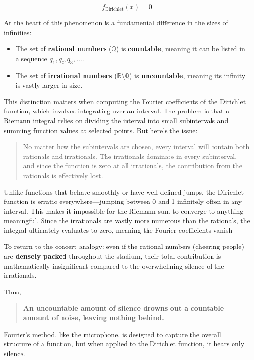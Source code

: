 \[
f_{\text{Dirichlet}}(x) = 0
\]

At the heart of this phenomenon is a fundamental difference in the sizes of infinities:

\begin{itemize}
    \item The set of \textbf{rational numbers} (\(\mathbb{Q}\)) is \textbf{countable}, meaning it can be listed in a sequence \( q_1, q_2, q_3, \dots \).
    \item The set of \textbf{irrational numbers} (\(\mathbb{R} \setminus \mathbb{Q}\)) is \textbf{uncountable}, meaning its infinity is vastly larger in size.
\end{itemize}

This distinction matters when computing the Fourier coefficients of the Dirichlet function, which involves integrating over an interval. The problem is that a Riemann integral relies on dividing the interval into small subintervals and summing function values at selected points. But here’s the issue:

\begin{quote}
No matter how the subintervals are chosen, every interval will contain both rationals and irrationals. The irrationals dominate in every subinterval, and since the function is zero at all irrationals, the contribution from the rationals is effectively lost.
\end{quote}

Unlike functions that behave smoothly or have well-defined jumps, the Dirichlet function is erratic everywhere—jumping between 0 and 1 infinitely often in any interval. This makes it impossible for the Riemann sum to converge to anything meaningful. Since the irrationals are vastly more numerous than the rationals, the integral ultimately evaluates to zero, meaning the Fourier coefficients vanish.

To return to the concert analogy: even if the rational numbers (cheering people) are \textbf{densely packed} throughout the stadium, their total contribution is mathematically insignificant compared to the overwhelming silence of the irrationals.

Thus,  

\begin{quote}
\textbf{An uncountable amount of silence drowns out a countable amount of noise, leaving nothing behind.}  
\end{quote}

Fourier’s method, like the microphone, is designed to capture the overall structure of a function, but when applied to the Dirichlet function, it hears only silence.




